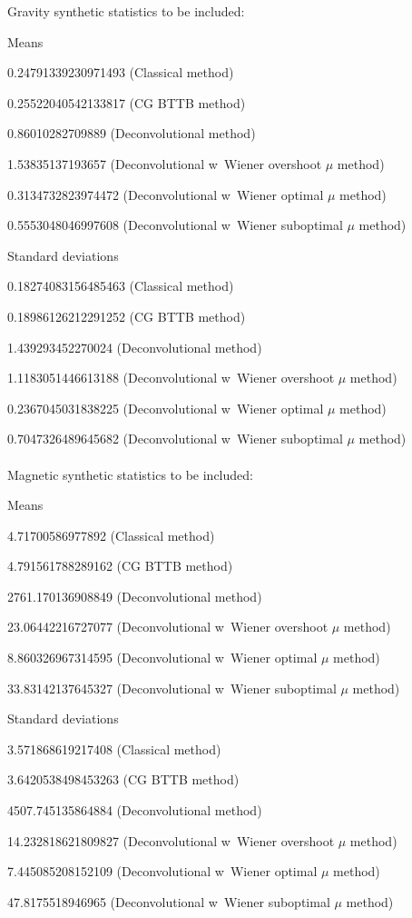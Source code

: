 Gravity synthetic statistics to be included:

Means

0.24791339230971493 (Classical method)

0.25522040542133817 (CG BTTB method)

0.86010282709889 (Deconvolutional method)

1.53835137193657 (Deconvolutional w\ Wiener overshoot $\mu$ method)

0.3134732823974472 (Deconvolutional w\ Wiener optimal $\mu$ method)

0.5553048046997608 (Deconvolutional w\ Wiener suboptimal $\mu$ method)

Standard deviations

0.18274083156485463 (Classical method)

0.18986126212291252 (CG BTTB method)

1.439293452270024 (Deconvolutional method)

1.1183051446613188 (Deconvolutional w\ Wiener overshoot $\mu$ method)

0.2367045031838225 (Deconvolutional w\ Wiener optimal $\mu$ method)

0.7047326489645682 (Deconvolutional w\ Wiener suboptimal $\mu$ method)
\\\\
Magnetic synthetic statistics to be included:

Means

4.71700586977892 (Classical method)

4.791561788289162 (CG BTTB method)

2761.170136908849 (Deconvolutional method)

23.06442216727077 (Deconvolutional w\ Wiener overshoot $\mu$ method)

8.860326967314595 (Deconvolutional w\ Wiener optimal $\mu$ method)

33.83142137645327 (Deconvolutional w\ Wiener suboptimal $\mu$ method)

Standard deviations

3.571868619217408 (Classical method)

3.6420538498453263 (CG BTTB method)

4507.745135864884 (Deconvolutional method)

14.232818621809827 (Deconvolutional w\ Wiener overshoot $\mu$ method)

7.445085208152109 (Deconvolutional w\ Wiener optimal $\mu$ method)

47.8175518946965 (Deconvolutional w\ Wiener suboptimal $\mu$ method)